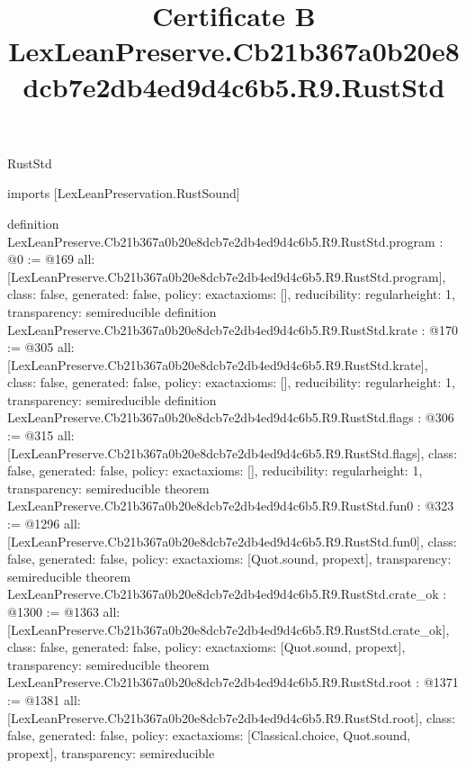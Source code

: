\begin{lexlean}{RustStd}
\title{Certificate B LexLeanPreserve.Cb21b367a0b20e8dcb7e2db4ed9d4c6b5.R9.RustStd}
\begin{coremodule}
imports [LexLeanPreservation.RustSound]

definition LexLeanPreserve.Cb21b367a0b20e8dcb7e2db4ed9d4c6b5.R9.RustStd.program : @0 := @169 {
  all: [LexLeanPreserve.Cb21b367a0b20e8dcb7e2db4ed9d4c6b5.R9.RustStd.program],
  class: false,
  generated: false,
  policy: exact{axioms: []},
  reducibility: regular{height: 1},
  transparency: semireducible
}
definition LexLeanPreserve.Cb21b367a0b20e8dcb7e2db4ed9d4c6b5.R9.RustStd.krate : @170 := @305 {
  all: [LexLeanPreserve.Cb21b367a0b20e8dcb7e2db4ed9d4c6b5.R9.RustStd.krate],
  class: false,
  generated: false,
  policy: exact{axioms: []},
  reducibility: regular{height: 1},
  transparency: semireducible
}
definition LexLeanPreserve.Cb21b367a0b20e8dcb7e2db4ed9d4c6b5.R9.RustStd.flags : @306 := @315 {
  all: [LexLeanPreserve.Cb21b367a0b20e8dcb7e2db4ed9d4c6b5.R9.RustStd.flags],
  class: false,
  generated: false,
  policy: exact{axioms: []},
  reducibility: regular{height: 1},
  transparency: semireducible
}
theorem LexLeanPreserve.Cb21b367a0b20e8dcb7e2db4ed9d4c6b5.R9.RustStd.fun0 : @323 := @1296 {
  all: [LexLeanPreserve.Cb21b367a0b20e8dcb7e2db4ed9d4c6b5.R9.RustStd.fun0],
  class: false,
  generated: false,
  policy: exact{axioms: [Quot.sound, propext]},
  transparency: semireducible
}
theorem LexLeanPreserve.Cb21b367a0b20e8dcb7e2db4ed9d4c6b5.R9.RustStd.crate_ok : @1300 := @1363 {
  all: [LexLeanPreserve.Cb21b367a0b20e8dcb7e2db4ed9d4c6b5.R9.RustStd.crate_ok],
  class: false,
  generated: false,
  policy: exact{axioms: [Quot.sound, propext]},
  transparency: semireducible
}
theorem LexLeanPreserve.Cb21b367a0b20e8dcb7e2db4ed9d4c6b5.R9.RustStd.root : @1371 := @1381 {
  all: [LexLeanPreserve.Cb21b367a0b20e8dcb7e2db4ed9d4c6b5.R9.RustStd.root],
  class: false,
  generated: false,
  policy: exact{axioms: [Classical.choice, Quot.sound, propext]},
  transparency: semireducible
}


\end{coremodule}
\end{lexlean}
